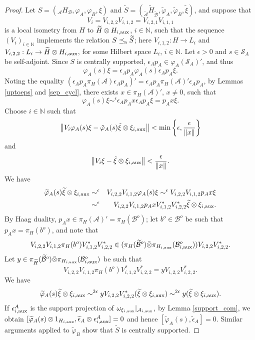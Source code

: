 \documentclass[11pt]{amsart}
\theoremstyle{definition}
\newcommand{\cl}[1]{\mathcal{#1}}
\newcommand{\bb}[1]{\mathbb{#1}}
\newcommand{\vphi}{\varphi}
\providecommand{\wt}[1]{\widetilde{#1}}
\begin{document}
\begin{proof}
Let $S = (_{\cl A}H_{\cl B}, \varphi_A, \varphi_B, \xi)$ and 
$\wt{S} = (_{\wt{\cl A}}\wt{H}_{\wt{\cl B}}, \wt{\varphi}_A, 
\wt{\varphi}_B, \wt{\xi})$, 
    and suppose that 
    $$V_i = V_{i,2,2}V_{i,1,2} = V_{i,2,1}V_{i,1,1}$$ 
    is a local isometry from $H$ to 
    $\wt{ H}\otimes H_{i,\rm aux}$, $i\in \bb{N}$, such that the 
    sequence $(V_i)_{i\in \bb{N}}$ implements the relation $S\preceq_{\rm a}\wt{S}$; here 
    $V_{i,1,2} : H\to L_i$ and $V_{i,2,2} : L_i\to\wt{ H}\otimes H_{i,\rm aux}$, for some 
    Hilbert space $L_i$, $i\in \bb{N}$.
    Let $\epsilon>0$ and $s\in\cl S_A$ be self-adjoint.
Since $S$ is centrally supported, $\epsilon_A p_A\in \vphi_A(\cl S_A)'$, 
and thus 
$$\vphi_A(s)\xi=\epsilon_A p_A\vphi_A(s)\epsilon_A p_A\xi.$$
Noting the equality $(\epsilon_A p_A\pi_H(\cl A)\epsilon_A p_A)' = 
\epsilon_A p_A\pi_H(\cl A)'\epsilon_A p_A$, 
by Lemmas \ref{uptoeps} and \ref{sep_cycl},  
    there exists 
    $x\in  \pi_H(\cl A)'$, $x\neq 0$, such that $$\varphi_A(s)\xi\sim^\epsilon \epsilon_A p_Ax\epsilon_A p_A\xi=p_A x\xi.$$
    Choose $i\in \bb{N}$ such that 
$$\left\|V_i \varphi_A(s) \xi - 
\tilde\varphi_A(s)\tilde\xi \otimes\xi_{i,\rm aux}\right\| 
< \min\left\{\epsilon, \frac{\epsilon}{\|x\|}\right\}$$
and 
$$\left\|V_i \xi - 
\tilde\xi \otimes\xi_{i,\rm aux}\right\| 
< \frac{\epsilon}{\|x\|}.$$
We have 
\begin{eqnarray*}
\wt{\varphi}_A(s)\wt{\xi}\otimes\xi_{i,\rm aux} 
& \sim^{\epsilon} & 
V_{i,2,2}V_{i,1,2}\varphi_A(s)\xi
\sim^{\epsilon}
V_{i,2,2}V_{i,1,2}p_Ax\xi\\
& \sim^{\epsilon} & 
V_{i,2,2}V_{i,1,2}p_AxV_{i,1,2}^*V_{i,2,2}^*\wt{\xi}\otimes\xi_{i,\rm aux}.  
    \end{eqnarray*}
    By Haag duality, $p_Ax\in \pi_H(\cl A)'=\pi_H(\cl B^o)$; let $b^o\in \cl B^o$ be such that 
    $p_Ax = \pi_H(b^o)$, and note that  
$$V_{i,2,2}V_{i,1,2}\pi_H(b^o)V_{i,1,2}^*V_{i,2,2}^*
\in 
    (\pi_H(\wt{\cl B}^o)\bar\otimes \pi_{H_{i,{\rm aux}}}(\cl B_{i,{\rm aux}}^o))
    V_{i,2,2}V_{i,2,2}^*.$$
Let $y\in \pi_{\wt H}(\wt{\cl B}^o)\bar\otimes \pi_{H_{i,{\rm aux}}}(\cl B_{i,{\rm aux}}^o)$ 
be such that 
$$V_{i,2,2}V_{i,1,2}\pi_H(b^o)V_{i,1,2}^*V_{i,2,2}^* = yV_{i,2,2}V_{i,2,2}^*.$$ 
We have
$$\wt{\varphi}_A(s)\wt{\xi}\otimes\xi_{i,{\rm aux}}\sim^{3\epsilon}yV_{i,2,2}V_{i,2,2}^*(\wt{\xi}\otimes
\xi_{i,{\rm aux}}) \sim^{2 \epsilon} y(\wt{\xi}\otimes\xi_{i,{\rm aux}}).$$
If $\epsilon_{i,{\rm aux}}^A$ is the support projection of 
$\omega_{\xi_{i,{\rm aux}}}|_{\cl A_{i,{\rm aux}}}$, by Lemma \ref{support_com}, we obtain
$[\wt{\varphi}_A(s)\otimes 1_{H_{i,{\rm aux}}}, \wt{\epsilon}_A\otimes\epsilon_{i,{\rm aux}}^A]=0$ and  hence
$[\wt{\varphi}_A(s), \wt{\epsilon}_A]=0$. Similar arguments applied to $\wt{\varphi}_B$ show  that $\wt{S}$ is centrally supported.
\end{proof}
\end{document}
